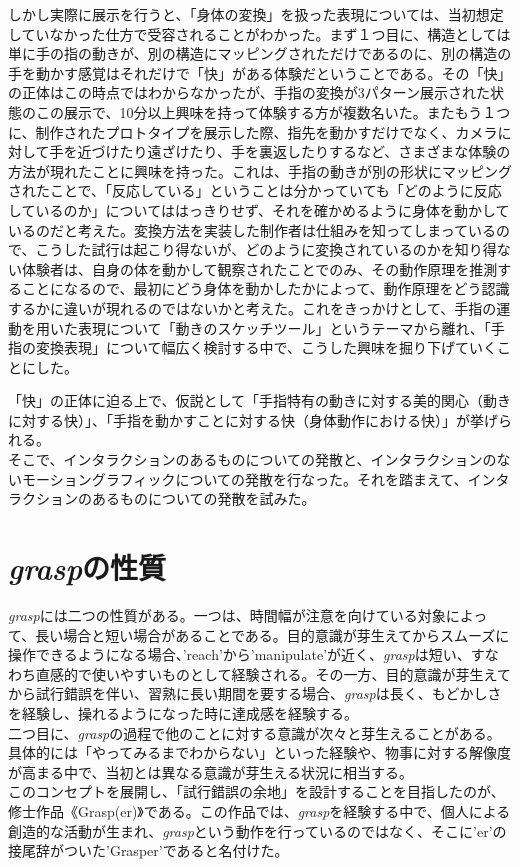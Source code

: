 しかし実際に展示を行うと、「身体の変換」を扱った表現については、当初想定していなかった仕方で受容されることがわかった。まず１つ目に、構造としては単に手の指の動きが、別の構造にマッピングされただけであるのに、別の構造の手を動かす感覚はそれだけで「快」がある体験だということである。その「快」の正体はこの時点ではわからなかったが、手指の変換が3パターン展示された状態のこの展示で、10分以上興味を持って体験する方が複数名いた。またもう１つに、制作されたプロトタイプを展示した際、指先を動かすだけでなく、カメラに対して手を近づけたり遠ざけたり、手を裏返したりするなど、さまざまな体験の方法が現れたことに興味を持った。これは、手指の動きが別の形状にマッピングされたことで、「反応している」ということは分かっていても「どのように反応しているのか」についてははっきりせず、それを確かめるように身体を動かしているのだと考えた。変換方法を実装した制作者は仕組みを知ってしまっているので、こうした試行は起こり得ないが、どのように変換されているのかを知り得ない体験者は、自身の体を動かして観察されたことでのみ、その動作原理を推測することになるので、最初にどう身体を動かしたかによって、動作原理をどう認識するかに違いが現れるのではないかと考えた。これをきっかけとして、手指の運動を用いた表現について「動きのスケッチツール」というテーマから離れ、「手指の変換表現」について幅広く検討する中で、こうした興味を掘り下げていくことにした。

「快」の正体に迫る上で、仮説として「手指特有の動きに対する美的関心（動きに対する快）」、「手指を動かすことに対する快（身体動作における快）」が挙げられる。\\
そこで、インタラクションのあるものについての発散と、インタラクションのないモーショングラフィックについての発散を行なった。それを踏まえて、インタラクションのあるものについての発散を試みた。


\section{\textit{grasp}の性質}
\textit{grasp}には二つの性質がある。一つは、時間幅が注意を向けている対象によって、長い場合と短い場合があることである。目的意識が芽生えてからスムーズに操作できるようになる場合、'reach'から'manipulate'が近く、\textit{grasp}は短い、すなわち直感的で使いやすいものとして経験される。その一方、目的意識が芽生えてから試行錯誤を伴い、習熟に長い期間を要する場合、\textit{grasp}は長く、もどかしさを経験し、操れるようになった時に達成感を経験する。\\

二つ目に、\textit{grasp}の過程で他のことに対する意識が次々と芽生えることがある。具体的には「やってみるまでわからない」といった経験や、物事に対する解像度が高まる中で、当初とは異なる意識が芽生える状況に相当する。\\

このコンセプトを展開し、「試行錯誤の余地」を設計することを目指したのが、修士作品《Grasp(er)》である。この作品では、\textit{grasp}を経験する中で、個人による創造的な活動が生まれ、\textit{grasp}という動作を行っているのではなく、そこに'er'の接尾辞がついた'Grasper'であると名付けた。